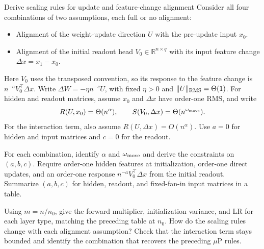 \begin{problem}{Derive scaling rules for update and feature-change alignment}
Consider all four combinations of two assumptions, each full or no alignment:
\begin{itemize}
\item Alignment of the weight-update direction $U$ with the pre-update input $x_0$.
\item Alignment of the initial readout head $V_0\in\mathbb R^{n\times q}$
with its input feature change $\Delta x=x_1-x_0$.
\end{itemize}
Here $V_0$ uses the transposed convention, so its response to the feature
change is $n^{-a}V_0^\top\Delta x$.
Write $\Delta W=-\eta n^{-c}U$, with fixed $\eta>0$ and
$\|U\|_{\rm RMS}=\Theta(1)$. For hidden and readout matrices, assume
$x_0$ and $\Delta x$ have order-one RMS, and write
\[
 R(U,x_0)=\Theta(n^\alpha),\qquad
 S(V_0,\Delta x)=\Theta(n^{\omega_{\rm move}}).
\]
For the interaction term, also assume $R(U,\Delta x)=O(n^\alpha)$.
Use $a=0$ for hidden and input matrices and $c=0$ for the readout.
\begin{parts}
\item For each combination, identify $\alpha$ and $\omega_{\rm move}$ and derive the
constraints on $(a,b,c)$. Require order-one hidden features at initialization,
order-one direct updates, and an order-one response $n^{-a}V_0^\top\Delta x$ from the initial readout.
Summarize $(a,b,c)$ for hidden, readout, and fixed-fan-in input matrices in a table.
\item Using $m=n/n_0$, give the forward multiplier, initialization variance,
and LR for each layer type, matching the preceding table at $n_0$.
How do the scaling rules change with each alignment assumption?
Check that the interaction term stays bounded and identify the combination
that recovers the preceding $\mu$P rules.
\end{parts}
\end{problem}
